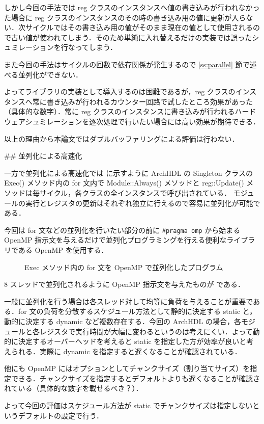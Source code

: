 しかし今回の手法では reg クラスのインスタンスへ値の書き込みが行われなかった場合に
reg クラスのインスタンスのその時の書き込み用の値に更新が入らない．次サイクルではその書き込み用の値がそのまま現在の値として使用されるので古い値が使われてしまう．そのため単純に入れ替えるだけの実装では誤ったシュミレーションを行なってしまう．

また今回の手法はサイクルの回数で依存関係が発生するので \ref{ss:parallel} 節で述べる並列化ができない．

よってライブラリの実装として導入するのは困難であるが，reg クラスのインスタンスへ常に書き込みが行われるカウンター回路で試したところ効果があった（具体的な数字）．常に reg クラスのインスタンスに書き込みが行われるハードウェアシュミレーションを逐次処理で行いたい場合には高い効果が期待できる．

以上の理由から本論文ではダブルバッファリングによる評価は行わない．



## 並列化による高速化 \label{ss:parallel}

一方で並列化による高速化では  に示すように
ArchHDL の Singleton クラスの Exec() メソッド内の
for 文内で Module::Always() メソッドと
reg::Update() メソッドは毎サイクル，各クラスの全インスタンスで呼び出されている．
モジュールの実行とレジスタの更新はそれぞれ独立に行えるので容易に並列化が可能である．

今回は for 文などの並列化を行いたい部分の前に \verb/#pragma omp/ から始まる OpenMP 指示文を与えるだけで並列化プログラミングを行える便利なライブラリである OpenMP \cite{openmp}を使用する．

\begin{figure}[t]
 
 \caption{Exec メソッド内の for 文を OpenMP で並列化したプログラム}
 \label{src:exec_openmp}
\end{figure}

8 スレッドで並列化されるように OpenMP 指示文を与えたものが  である．

一般に並列化を行う場合は各スレッド対して均等に負荷を与えることが重要である．for 文の負荷を分散するスケジュール方法として静的に決定する static と，動的に決定する dynamic など複数存在する．今回の ArchHDL の場合，各モジュールと各レジスタで実行時間が大幅に変わるというのは考えにくい．よって動的に決定するオーバーヘッドを考えると static を指定した方が効率が良いと考えられる．実際に dynamic を指定すると遅くなることが確認されている．

他にも OpenMP にはオプションとしてチャンクサイズ（割り当てサイズ）を指定できる．チャンクサイズを指定するとデフォルトよりも遅くなることが確認されている（具体的な数字を載せるべき？）．

よって今回の評価はスケジュール方法が static でチャンクサイズは指定しないというデフォルトの設定で行う．

